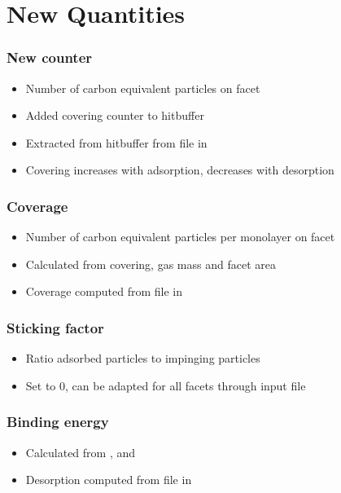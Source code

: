 \section{New Quantities}
\label{sub:quant}
\subsubsection{New counter }
\begin{itemize}[noitemsep,topsep=0pt]
\item Number of carbon equivalent particles on facet
\item Added covering counter to hitbuffer
\item Extracted from hitbuffer from  file in 
\item Covering increases with adsorption, decreases with desorption
\end{itemize}

\subsubsection{Coverage}
\begin{itemize}[noitemsep,topsep=0pt]
\item Number of carbon equivalent particles per monolayer on facet
\item Calculated from covering, gas mass and facet area
\item Coverage computed from  file in 
\end{itemize}

\subsubsection{Sticking factor}
\begin{itemize}[noitemsep,topsep=0pt]
\item Ratio adsorbed particles to impinging particles
\item Set to 0, can be adapted for all facets through input file
\end{itemize}

\subsubsection{Binding energy}
\begin{itemize}[noitemsep,topsep=0pt]
\item Calculated from ,  and 
\item Desorption computed from  file in 
\end{itemize}


